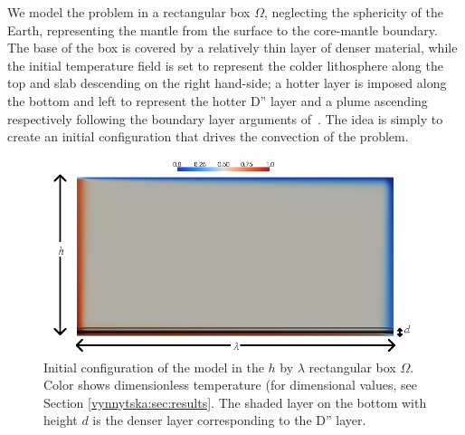 We model the problem in a rectangular box $\Omega$, neglecting the
sphericity of the Earth, representing the mantle from the surface to
the core-mantle boundary. The base of the box is covered by a
relatively thin layer of denser material, while the initial
temperature field is set to represent the colder lithosphere along the
top and slab descending on the right hand-side; a hotter layer is
imposed along the bottom and left to represent the hotter D'' layer
and a plume ascending respectively following the boundary layer
arguments of~\citet{KekenEtAl1997}. The idea is simply to create an
initial configuration that drives the convection of the problem.
\begin{figure}[htbp]
  \begin{center}
   \includegraphics[width=0.95\columnwidth]{chapters/vynnytska/figures/layout.png}
    \caption{Initial configuration of the model in the $h$ by
      $\lambda$ rectangular box $\Omega$. Color shows dimensionless
      temperature (for dimensional values, see
      Section \ref{vynnytska:sec:results}. The shaded layer on the
      bottom with height $d$ is the denser layer corresponding to the
      D'' layer.}
  \end{center}
\end{figure}

